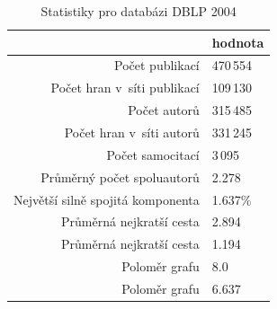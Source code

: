 \documentclass{bakalarka}
\begin{document}
\begin{table}[!ht]
\centering
\caption{Statistiky pro databázi DBLP 2004}
\label{tab:dblpstat}
\begin{tabular}{r|l}
\toprule
& hodnota \\
\midrule
Počet publikací & 470\,554 \\
Počet hran v~síti publikací & 109\,130 \\
Počet autorů & 315\,485 \\
Počet hran v~síti autorů & 331\,245 \\
Počet samocitací & 3\,095 \\
Průměrný počet spoluautorů & 2.278 \\
Největší silně spojitá komponenta & 1.637\% \\
Průměrná nejkratší cesta\footnotemark[1] & 2.894 \\
Průměrná nejkratší cesta\footnotemark[2] & 1.194 \\
Poloměr grafu\footnotemark[1] & 8.0 \\
Poloměr grafu\footnotemark[2] & 6.637 \\
\bottomrule
\end{tabular}
\end{table}
\end{document}
